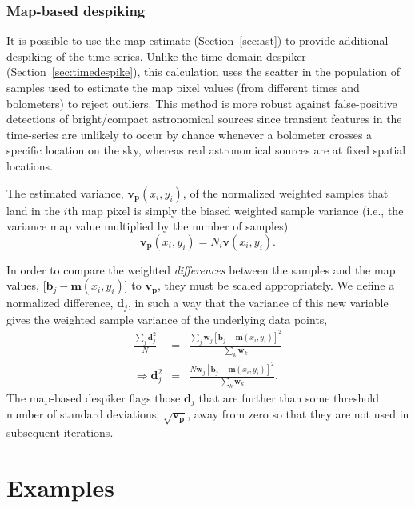 \documentclass[useAMS,usenatbib,nofootinbib]{mn2e}
\begin{document}
\subsubsection{Map-based despiking}
\label{sec:mapdespike}

It is possible to use the map estimate (Section~\ref{sec:ast}) to
provide additional despiking of the time-series. Unlike the
time-domain despiker (Section~\ref{sec:timedespike}), this calculation
uses the scatter in the population of samples used to estimate the map
pixel values (from different times and bolometers) to reject
outliers. This method is more robust against false-positive detections
of bright/compact astronomical sources since transient features in the
time-series are unlikely to occur by chance whenever a bolometer
crosses a specific location on the sky, whereas real astronomical
sources are at fixed spatial locations.

The estimated variance, $\mathbf{v_p}(x_i,y_i)$, of the normalized
weighted samples that land in the $i$th map pixel is simply the biased
weighted sample variance (i.e., the variance map value multiplied by
the number of samples)
%
\begin{equation}
  \mathbf{v_p}(x_i,y_i) = N_i \mathbf{v}(x_i,y_i).
\end{equation}

In order to compare the weighted \emph{differences} between the
samples and the map values, [$\mathbf{b}_j - \mathbf{m}(x_i,y_i)$] to
$\mathbf{v_p}$, they must be scaled appropriately. We define a
normalized difference, $\mathbf{d}_j$, in such a way that the variance
of this new variable gives the weighted sample variance of the
underlying data points,
%
\begin{eqnarray}
  \frac{\sum_j \mathbf{d}_j^2}{N} &=&
  \frac{\sum_j \mathbf{w}_j [\mathbf{b}_j - \mathbf{m}(x_i,y_i)]^2}
       {\sum_k \mathbf{w}_k} \\
   \Rightarrow \mathbf{d}_j^2 &=& \frac{N \mathbf{w}_j [\mathbf{b}_j -
       \mathbf{m}(x_i,y_i)]^2}{ \sum_k \mathbf{w}_k} .
\end{eqnarray}
%
The map-based despiker flags those $\mathbf{d}_j$ that are further
than some threshold number of standard deviations,
$\sqrt{\mathbf{v_p}}$, away from zero so that they are not used in
subsequent iterations.


\section{Examples}
\label{sec:examples}
\end{document}
